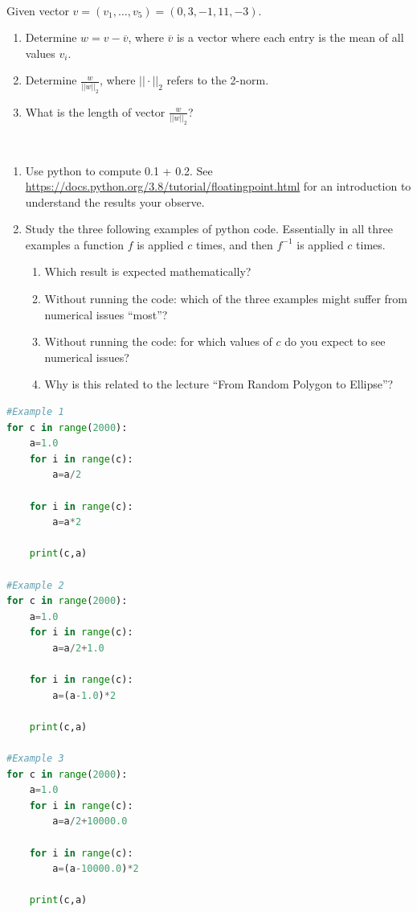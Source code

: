 \documentclass[10pt]{article}
\begin{document}
\\
 Given vector $v=(v_1, \ldots, v_5) = (0,3,-1,11,-3)$.
\begin{enumerate}
\item Determine $w=v-\overline{v}$, where $\overline{v}$ is a
  vector where each entry is the mean of all values $v_i$.
\item Determine $\frac{w}{||w||_2}$, where $||\cdot||_2$ refers to the 2-norm.
\item What is the length of vector $\frac{w}{||w||_2}$?
\end{enumerate}

\\
\begin{enumerate}
\item Use python to compute 0.1 + 0.2. See
  \url{https://docs.python.org/3.8/tutorial/floatingpoint.html} for an
  introduction to understand the results your observe.
\item Study the three following examples of python code. Essentially in all
three examples a function $f$ is applied $c$ times, and then $f^{-1}$
is applied $c$ times.
\begin{enumerate}
\item Which result is expected mathematically?
\item Without running the code: which of the three examples might
  suffer from numerical issues ``most''?
\item Without running the code: for which values of $c$ do you expect
  to see numerical issues? 
\item Why is this related to the lecture ``From Random
  Polygon to Ellipse''?
\end{enumerate}
\end{enumerate}
\newpage
\begin{lstlisting}[language=Python]
#Example 1
for c in range(2000):
    a=1.0
    for i in range(c):
        a=a/2
    
    for i in range(c):
        a=a*2
    
    print(c,a)

#Example 2
for c in range(2000):
    a=1.0
    for i in range(c):
        a=a/2+1.0
    
    for i in range(c):
        a=(a-1.0)*2
    
    print(c,a)

#Example 3
for c in range(2000):
    a=1.0
    for i in range(c):
        a=a/2+10000.0
    
    for i in range(c):
        a=(a-10000.0)*2
    
    print(c,a)
\end{lstlisting}
\end{document}
